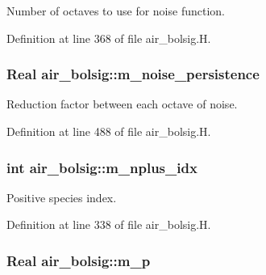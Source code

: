 Number of octaves to use for noise function. 



Definition at line 368 of file air\+\_\+bolsig.\+H.

\subsubsection[{\texorpdfstring{m\+\_\+noise\+\_\+persistence}{m_noise_persistence}}]{\setlength{\rightskip}{0pt plus 5cm}Real air\+\_\+bolsig\+::m\+\_\+noise\+\_\+persistence\hspace{0.3cm}{\ttfamily [protected]}}\hypertarget{classair__bolsig_a85a379381c3ed1c8c13ae72fed18a1eb}{}\label{classair__bolsig_a85a379381c3ed1c8c13ae72fed18a1eb}


Reduction factor between each octave of noise. 



Definition at line 488 of file air\+\_\+bolsig.\+H.

\subsubsection[{\texorpdfstring{m\+\_\+nplus\+\_\+idx}{m_nplus_idx}}]{\setlength{\rightskip}{0pt plus 5cm}int air\+\_\+bolsig\+::m\+\_\+nplus\+\_\+idx\hspace{0.3cm}{\ttfamily [protected]}}\hypertarget{classair__bolsig_a1fa343816af83c384219bafa3e98fc64}{}\label{classair__bolsig_a1fa343816af83c384219bafa3e98fc64}


Positive species index. 



Definition at line 338 of file air\+\_\+bolsig.\+H.

\subsubsection[{\texorpdfstring{m\+\_\+p}{m_p}}]{\setlength{\rightskip}{0pt plus 5cm}Real air\+\_\+bolsig\+::m\+\_\+p\hspace{0.3cm}{\ttfamily [protected]}}\hypertarget{classair__bolsig_a7055727a92e7ffdb0a82a42dd229888c}{}\label{classair__bolsig_a7055727a92e7ffdb0a82a42dd229888c}


